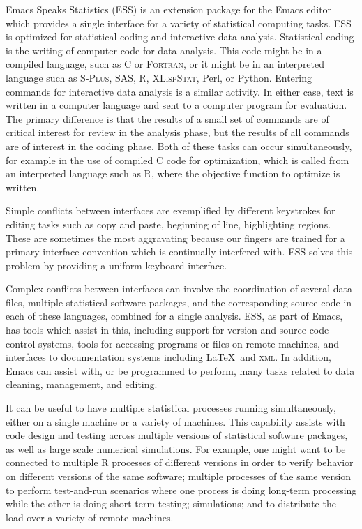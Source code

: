 \documentclass{article}
\newcommand*{\Splus}{\textsc{S-Plus}}
\newcommand*{\XLispStat}{\textsc{XLispStat}}
\newcommand*{\Fortran}{\textsc{Fortran}}
\begin{document}
Emacs Speaks Statistics (ESS) \citep{ESS} is an extension package for
the Emacs editor which provides a single interface for a variety of
statistical computing tasks.  ESS is optimized for statistical coding
and interactive data analysis.  Statistical coding is the writing of
computer code for data analysis.  This code might be in a compiled
language, such as C or \Fortran, or it might be in an interpreted
language such as \Splus, SAS, R, \XLispStat, Perl, or Python.
Entering commands for interactive data analysis is a similar activity.
In either case, text is written in a computer language and sent to a
computer program for evaluation.  The primary difference is that the
results of a small set of commands are of critical interest for review
in the analysis phase, but the results of all commands are of interest
in the coding phase.  Both of these tasks can occur simultaneously,
for example in the use of compiled C code for optimization, which is
called from an interpreted language such as R, where the objective
function to optimize is written.

Simple conflicts between interfaces are exemplified by different
keystrokes for editing tasks such as copy and paste, beginning of
line, highlighting regions.  These are sometimes the most aggravating
because our fingers are trained for a primary interface convention
which is continually interfered with.  ESS solves this problem by
providing a uniform keyboard interface.

Complex conflicts between interfaces can involve the coordination of
several data files, multiple statistical software packages, and the
corresponding source code in each of these languages, combined for a
single analysis.  ESS, as part of Emacs, has tools which assist in
this, including support for version and source code control systems,
tools for accessing programs or files on remote machines, and
interfaces to documentation systems including \LaTeX\ and
\textsc{xml}.  In addition, Emacs can assist with, or be programmed to
perform, many tasks related to data cleaning, management, and editing.

It can be useful to have multiple statistical processes running
simultaneously, either on a single machine or a variety of machines.
This capability assists with code design and testing across multiple
versions of statistical software packages, as well as large scale
numerical simulations.  For example, one might want to be connected to
multiple R processes of different versions in order to verify behavior
on different versions of the same software; multiple processes of the
same version to perform test-and-run scenarios where one process is
doing long-term processing while the other is doing short-term
testing; simulations; and to distribute the load over a variety of
remote machines.
\end{document}
